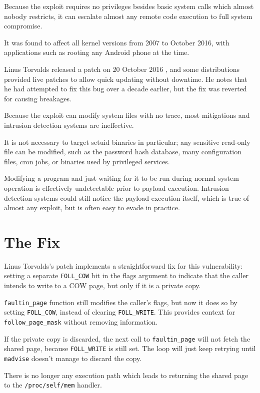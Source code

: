 \documentclass[a4paper,10pt,twocolumn,english]{article}
\newcommand{\code}[1]{\texttt{#1}}
\begin{document}
Because the exploit requires no privileges besides basic system calls which almost nobody restricts, it can escalate almost any remote code execution to full system compromise.

It was found to affect all kernel versions from 2007 to October 2016, with applications such as rooting any Android phone at the time.

Linus Torvalds released a patch on 20 October 2016 \cite{linus2016commit}, and some distributions provided live patches to allow quick updating without downtime.
He notes that he had attempted to fix this bug over a decade earlier, but the fix was reverted for causing breakages.

Because the exploit can modify system files with no trace, most mitigations and intrusion detection systems are ineffective.

It is not necessary to target setuid binaries in particular; any sensitive read-only file can be modified, such as the password hash database,
many configuration files, cron jobs, or binaries used by privileged services.

Modifying a program and just waiting for it to be run during normal system operation is effectively undetectable prior to payload execution.
Intrusion detection systems could still notice the payload execution itself, which is true of almost any exploit, but is often easy to evade in practice.

\section{The Fix}

Linus Torvalds's patch implements a straightforward fix for this vulnerability: setting a separate \code{FOLL\_COW} bit in the flags argument
to indicate that the caller intends to write to a COW page, but only if it is a private copy.

\code{faultin\_page} function still modifies the caller's flags, but now it does so by setting \code{FOLL\_COW}, instead of clearing \code{FOLL\_WRITE}.
This provides context for \code{follow\_page\_mask} without removing information.

If the private copy is discarded, the next call to \code{faultin\_page} will not fetch the shared page, because \code{FOLL\_WRITE} is still set.
The loop will just keep retrying until \code{madvise} doesn't manage to discard the copy.

There is no longer any execution path which leads to returning the shared page to the \code{/proc/self/mem} handler.
\end{document}
